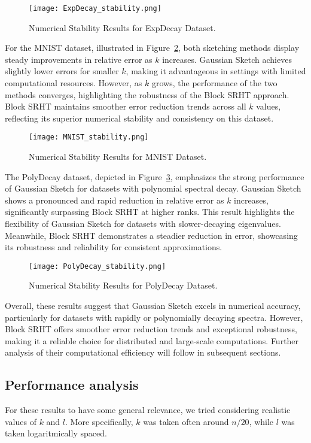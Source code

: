 \documentclass[a4paper, 12pt,oneside]{article}
\begin{document}
\begin{figure}[H]
\centering
\texttt{[image: ExpDecay\_stability.png]}
\caption{Numerical Stability Results for ExpDecay Dataset.}
\label{fig:expdecay}
\end{figure}

For the MNIST dataset, illustrated in Figure~\ref{fig:mnist}, both sketching methods display steady improvements in relative error as \(k\) increases. Gaussian Sketch achieves slightly lower errors for smaller \(k\), making it advantageous in settings with limited computational resources. However, as \(k\) grows, the performance of the two methods converges, highlighting the robustness of the Block SRHT approach. Block SRHT maintains smoother error reduction trends across all \(k\) values, reflecting its superior numerical stability and consistency on this dataset.

\begin{figure}[H]
\centering
\texttt{[image: MNIST\_stability.png]}
\caption{Numerical Stability Results for MNIST Dataset.}
\label{fig:mnist}
\end{figure}

The PolyDecay dataset, depicted in Figure~\ref{fig:polydecay}, emphasizes the strong performance of Gaussian Sketch for datasets with polynomial spectral decay. Gaussian Sketch shows a pronounced and rapid reduction in relative error as \(k\) increases, significantly surpassing Block SRHT at higher ranks. This result highlights the flexibility of Gaussian Sketch for datasets with slower-decaying eigenvalues. Meanwhile, Block SRHT demonstrates a steadier reduction in error, showcasing its robustness and reliability for consistent approximations.

\begin{figure}[H]
\centering
\texttt{[image: PolyDecay\_stability.png]}
\caption{Numerical Stability Results for PolyDecay Dataset.}
\label{fig:polydecay}
\end{figure}

Overall, these results suggest that Gaussian Sketch excels in numerical accuracy, particularly for datasets with rapidly or polynomially decaying spectra. However, Block SRHT offers smoother error reduction trends and exceptional robustness, making it a reliable choice for distributed and large-scale computations. Further analysis of their computational efficiency will follow in subsequent sections.
	\subsection{Performance analysis}
		For these results to have some general relevance, we tried considering realistic values of $k$ and $l$. More specifically, $k$ was taken often around $n/20$, while $l$ was taken logaritmically spaced.
	
\end{document}
